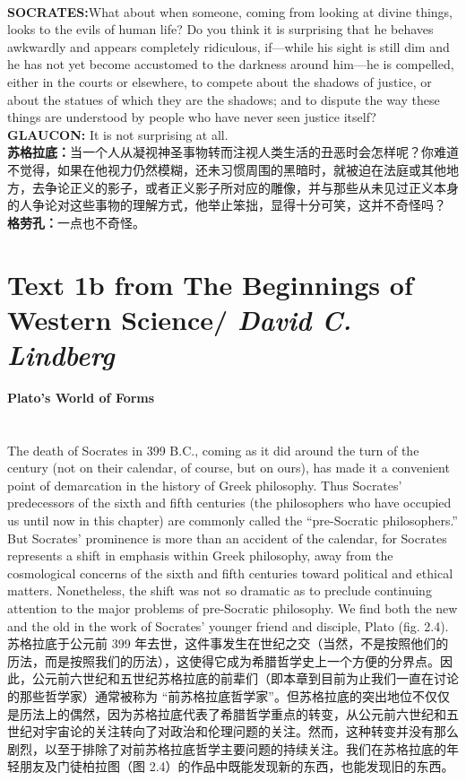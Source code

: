 \documentclass{article}
\begin{document}
\\
\textbf{SOCRATES:}What about when someone, coming from looking at divine things, looks to the evils of human life? Do you think it is surprising that he behaves awkwardly and appears completely ridiculous, if—while his sight is still dim and he has not yet become accustomed to the darkness around him—he is compelled, either in the courts or elsewhere, to compete about the shadows of justice, or about the statues of which they are the shadows; and to dispute the way these things are understood by people who have never seen justice itself?\\
\textbf{GLAUCON: }It is not surprising at all.\\
\textbf{苏格拉底：}当一个人从凝视神圣事物转而注视人类生活的丑恶时会怎样呢？你难道不觉得，如果在他视力仍然模糊，还未习惯周围的黑暗时，就被迫在法庭或其他地方，去争论正义的影子，或者正义影子所对应的雕像，并与那些从未见过正义本身的人争论对这些事物的理解方式，他举止笨拙，显得十分可笑，这并不奇怪吗？\\
\textbf{格劳孔：}一点也不奇怪。\\

\newpage
\section{Text 1b from The Beginnings of Western Science/ \textit{David C. Lindberg}}
\textbf{Plato’s World of Forms}\\
\\\\
The death of Socrates in 399 B.C., coming as it did around the turn of the century (not on their calendar, of course, but on ours), has made it a convenient point of demarcation in the history of Greek philosophy. Thus Socrates’ predecessors of the sixth and fifth centuries (the philosophers who have occupied us until now in this chapter) are commonly called the “pre-Socratic philosophers.” But Socrates’ prominence is more than an accident of the calendar, for Socrates represents a shift in emphasis within Greek philosophy, away from the cosmological concerns of the sixth and fifth centuries toward political and ethical matters. Nonetheless, the shift was not so dramatic as to preclude continuing attention to the major problems of pre-Socratic philosophy. We find both the new and the old in the work of Socrates’ younger friend and disciple, Plato (fig. 2.4).\\
苏格拉底于公元前 399 年去世，这件事发生在世纪之交（当然，不是按照他们的历法，而是按照我们的历法），这使得它成为希腊哲学史上一个方便的分界点。因此，公元前六世纪和五世纪苏格拉底的前辈们（即本章到目前为止我们一直在讨论的那些哲学家）通常被称为 “前苏格拉底哲学家”。但苏格拉底的突出地位不仅仅是历法上的偶然，因为苏格拉底代表了希腊哲学重点的转变，从公元前六世纪和五世纪对宇宙论的关注转向了对政治和伦理问题的关注。然而，这种转变并没有那么剧烈，以至于排除了对前苏格拉底哲学主要问题的持续关注。我们在苏格拉底的年轻朋友及门徒柏拉图（图 2.4）的作品中既能发现新的东西，也能发现旧的东西。\\
\end{document}
